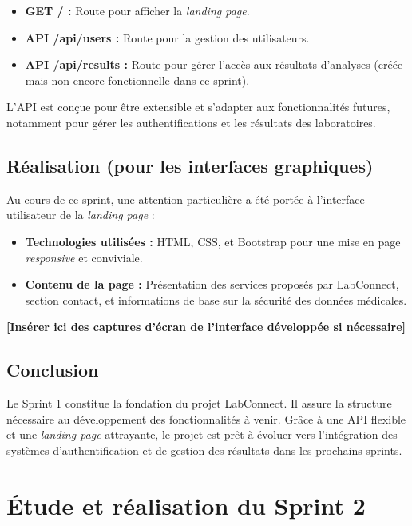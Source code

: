 \documentclass[12pt,a4paper]{report}
\begin{document}
\begin{itemize}
    \item \textbf{GET / :} Route pour afficher la \textit{landing page}.
    \item \textbf{API /api/users :} Route pour la gestion des utilisateurs.
    \item \textbf{API /api/results :} Route pour gérer l'accès aux résultats d'analyses (créée mais non encore fonctionnelle dans ce sprint).
\end{itemize}

L’API est conçue pour être extensible et s’adapter aux fonctionnalités futures, notamment pour gérer les authentifications et les résultats des laboratoires.

\section{Réalisation (pour les interfaces graphiques)}

Au cours de ce sprint, une attention particulière a été portée à l’interface utilisateur de la \textit{landing page} :

\begin{itemize}
    \item \textbf{Technologies utilisées :} HTML, CSS, et Bootstrap pour une mise en page \textit{responsive} et conviviale.
    \item \textbf{Contenu de la page :} Présentation des services proposés par LabConnect, section contact, et informations de base sur la sécurité des données médicales.
\end{itemize}

\textbf{[Insérer ici des captures d’écran de l’interface développée si nécessaire]}

\section{Conclusion}

Le Sprint 1 constitue la fondation du projet LabConnect. Il assure la structure nécessaire au développement des fonctionnalités à venir. Grâce à une API flexible et une \textit{landing page} attrayante, le projet est prêt à évoluer vers l’intégration des systèmes d’authentification et de gestion des résultats dans les prochains sprints.

\chapter{Étude et réalisation du Sprint 2}
\end{document}
